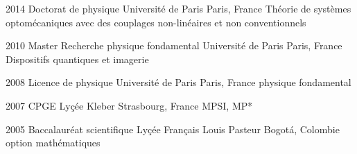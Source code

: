 
\myDiplomaEntry
    {2014}
    {Doctorat de physique}
    {Université de Paris}
    {Paris, France}
    {Théorie de systèmes optomécaniques avec des couplages non-linéaires et non conventionnels}

\myDiplomaEntry
    {2010}
    {Master Recherche physique fondamental}
    {Université de Paris}
    {Paris, France}
    {Dispositifs quantiques et imagerie}

\myDiplomaEntry
    {2008}
    {Licence de physique}
    {Université de Paris}
    {Paris, France}
    {physique fondamental}

\myDiplomaEntry
    {2007}
    {CPGE}
    {Lyçée Kleber}
    {Strasbourg, France}
    {MPSI, MP*}

\myDiplomaEntry
    {2005}
    {Baccalauréat scientifique}
    {Lyçée Français Louis Pasteur}
    {Bogot\'a, Colombie}
    {option mathématiques}